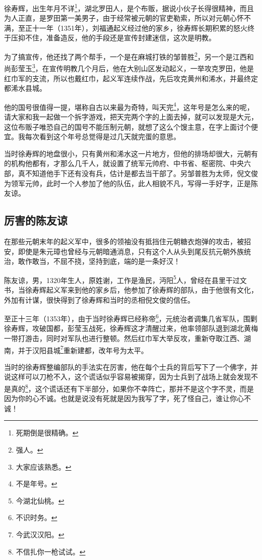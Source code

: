 \begin{multicols}{\theparacolNo}
		徐寿辉，出生年月不详\footnote{死期倒是很精确。}，湖北罗田人，是个布贩，据说小伙子长得很精神，而且为人正直，是罗田第一美男子，由于经常被元朝的官吏勒索，所以对元朝心怀不满，至正十一年（1351年），刘福通起义经过他的家乡，徐寿辉长期积累的怒火终于压抑不住，准备造反，他的手段还是宣传封建迷信，这次是明教。

		为了搞宣传，他还找了两个帮手，一个是在麻城打铁的邹普胜\footnote{强人。}，另一个是江西和尚彭莹玉\footnote{大家应该熟悉。}，在宣传明教几个月后，他在大别山区发动起义，一举攻克罗田，他是红巾军的支流，所以也戴红巾，起义军连续作战，先后攻克黄州和浠水，并最终定都浠水县城。

		他的国号很值得一提，堪称自古以来最为奇特，叫天完\footnote{不是年号。}，这年号是怎么来的呢，请大家和我一起做一个拆字游戏，把天完两个字的上面去掉，就可以发现是大元，这位布贩子唯恐自己的国号不能压制元朝，就想了这么个馊主意，在字上面讨个便宜。我每次看到这个年号总觉得是过几天就完蛋的意思。

		当时徐寿辉的地盘很小，只有黄州和浠水这一片地方，但他的排场却很大，元朝有的机构他都有，才那么几千人，就设置了统军元帅府、中书省、枢密院、中央六部，真不知道他手下还有没有兵，估计是都去当干部了。另邹普胜为太师，倪文俊为领军元帅，此时一个人参加了他的队伍，此人相貌不凡，写得一手好字，正是陈友谅。

		\subsection{厉害的陈友谅}
		在那些元朝末年的起义军中，很多的领袖没有抵挡住元朝糖衣炮弹的攻击，被招安，即使是朱元璋也曾经与元朝暗通消息，只有这个人从头到尾反抗元朝外族统治，敢作敢当，不屈不挠，坚持到底，端的是一条好汉！

		陈友谅，男，1320年生人，原姓谢，工作是渔民，沔阳\footnote{今湖北仙桃。}人，曾经在县里干过文书，当徐寿辉起义军来到他的家乡后，他参加了徐寿辉的部队，由于他很有文化，外加有计谋，很快得到了徐寿辉和当时的丞相倪文俊的信任。

		至正十三年（1353年），由于当时徐寿辉已经称帝\footnote{不识时务。}，元统治者调集几省军队，围剿徐寿辉，攻破国都，彭莹玉战死，徐寿辉这才清醒过来，他率领部队退到湖北黄梅一带打游击，同时对军队也进行整顿。然后红巾军大举反攻，重新夺取江西、湖南，并于汉阳县城\footnote{今武汉汉阳。}重新建都，改年号为太平。

		当时的徐寿辉整编部队的手法实在厉害，他在每个士兵的背后写下了一个佛字，并说这样可以刀枪不入，这个谎话似乎容易被揭穿，因为士兵到了战场上就会发现不是真的\footnote{不信扎你一枪试试。}，这个谎话还有下半部分，如果你不幸阵亡，那并不是这个字不灵，而是因为你的心不诚。也就是说没有死就是因为我写了字，死了怪自己，谁让你心不诚！


\end{multicols}
